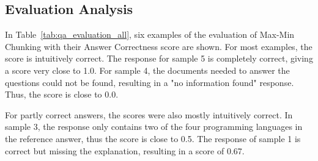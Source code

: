 \documentclass[12pt]{article} %
\begin{document}
\subsection{Evaluation Analysis}
In Table~\ref{tab:qa_evaluation_all}, six examples of the evaluation of Max-Min Chunking with their Answer Correctness score are shown. For most examples, the score is intuitively correct. The response for sample 5 is completely correct, giving a score very close to 1.0. For sample 4, the documents needed to answer the questions could not be found, resulting in a "no information found" response. Thus, the score is close to 0.0.

For partly correct answers, the scores were also mostly intuitively correct. In sample 3, the response only contains two of the four programming languages in the reference answer, thus the score is close to 0.5. The response of sample 1 is correct but missing the explanation, resulting in a score of 0.67.
\end{document}
